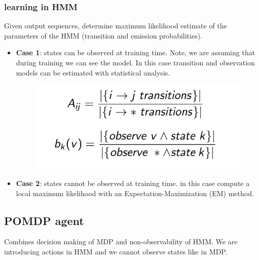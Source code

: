 \subsubsection{learning in HMM}

Given output sequences, determine maximum likelihood estimate of the parameters of the HMM (transition and emission probabilities).

\begin{itemize}
    \item \textbf{Case 1}: states can be observed at training time. Note, we are assuming that during training we can see the model. In this case transition and observation models can be estimated with statistical analysis.
    \begin{figure}[H]
        \centering
        \includegraphics[width=12cm]{images/Reinforcement Learning/case1hmm.png}
        \label{fig:case1hmm}
    \end{figure}

    \item \textbf{Case 2}: states cannot be observed at training time. in this case compute a local maximum likelihood with an Expectation-Maximization (EM) method.
\end{itemize}

\subsection{POMDP agent}

Combines decision making of MDP and non-observability of HMM. We are introducing actions in HMM and we cannot observe states like in MDP.

